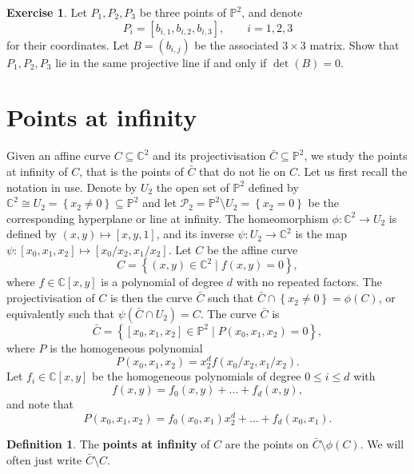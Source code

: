 \documentclass{article}
\newcommand{\C}{\mathbb{C}}
\renewcommand{\P}{\mathbb{P}}
\newcommand{\rb}[1]{\left( #1 \right)}
\renewcommand{\sb}[1]{\left[ #1 \right]}
\newcommand{\cb}[1]{\left\{ #1 \right\}}
\theoremstyle{definition}\newtheorem{definition}{Definition}[section]
\theoremstyle{definition}\newtheorem{notation}[definition]{Notation}
\theoremstyle{definition}\newtheorem{remark}[definition]{Remark}
\theoremstyle{definition}\newtheorem{example}[definition]{Example}
\theoremstyle{definition}\newtheorem{fact}{Fact}
\theoremstyle{definition}\newtheorem{exercise}{Exercise}
\begin{document}
\begin{exercise}
\label{ex:19}
Let $ P_1, P_2, P_3 $ be three points of $ \P^2 $, and denote
$$ P_i = \sb{b_{i, 1}, b_{i, 2}, b_{i, 3}}, \qquad i = 1, 2, 3 $$
for their coordinates. Let $ B = \rb{b_{i, j}} $ be the associated $ 3 \times 3 $ matrix. Show that $ P_1, P_2, P_3 $ lie in the same projective line if and only if $ \det\rb{B} = 0 $.
\end{exercise}

\section{Points at infinity}

Given an affine curve $ C \subseteq \C^2 $ and its projectivisation $ \bar{C} \subseteq \P^2 $, we study the points at infinity of $ C $, that is the points of $ \bar{C} $ that do not lie on $ C $. Let us first recall the notation in use. Denote by $ U_2 $ the open set of $ \P^2 $ defined by $ \C^2 \cong U_2 = \cb{x_2 \ne 0} \subseteq \P^2 $ and let $ \mathcal{P}_2 = \P^2 \setminus U_2 = \cb{x_2 = 0} $ be the corresponding hyperplane or line at infinity. The homeomorphism $ \phi : \C^2 \to U_2 $ is defined by $ \rb{x, y} \mapsto \sb{x, y, 1} $, and its inverse $ \psi : U_2 \to \C^2 $ is the map $ \psi : \sb{x_0, x_1, x_2} \mapsto \sb{x_0 / x_2, x_1 / x_2} $. Let $ C $ be the affine curve
$$ C = \cb{\rb{x, y} \in \C^2 \mid f\rb{x, y} = 0}, $$
where $ f \in \C\sb{x, y} $ is a polynomial of degree $ d $ with no repeated factors. The projectivisation of $ C $ is then the curve $ \bar{C} $ such that $ \bar{C} \cap \cb{x_2 \ne 0} = \phi\rb{C} $, or equivalently such that $ \psi\rb{\bar{C} \cap U_2} = C $. The curve $ \bar{C} $ is
$$ \bar{C} = \cb{\sb{x_0, x_1, x_2} \in \P^2 \mid P\rb{x_0, x_1, x_2} = 0}, $$
where $ P $ is the homogeneous polynomial
$$ P\rb{x_0, x_1, x_2} = x_2^df\rb{x_0 / x_2, x_1 / x_2}. $$
Let $ f_i \in \C\sb{x, y} $ be the homogeneous polynomials of degree $ 0 \le i \le d $ with
$$ f\rb{x, y} = f_0\rb{x, y} + \dots + f_d\rb{x, y}, $$
and note that
$$ P\rb{x_0, x_1, x_2} = f_0\rb{x_0, x_1}x_2^d + \dots + f_d\rb{x_0, x_1}. $$

\begin{definition}
The \textbf{points at infinity} of $ C $ are the points on $ \bar{C} \setminus \phi\rb{C} $. We will often just write $ \bar{C} \setminus C $.
\end{definition}
\end{document}
